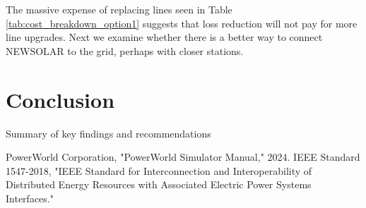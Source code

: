 \documentclass[conference]{IEEEtran}
\begin{document}
The massive expense of replacing lines seen in Table \ref{tab:cost_breakdown_option1} suggests that loss reduction will not pay for more line upgrades. Next we examine whether there is a better way to connect NEWSOLAR to the grid, perhaps with closer stations.
\section{Conclusion}
Summary of key findings and recommendations
	
\begin{thebibliography}{00}
	 PowerWorld Corporation, "PowerWorld Simulator Manual," 2024.
	 IEEE Standard 1547-2018, "IEEE Standard for Interconnection and Interoperability of Distributed Energy Resources with Associated Electric Power Systems Interfaces."
\end{thebibliography}
\end{document}

